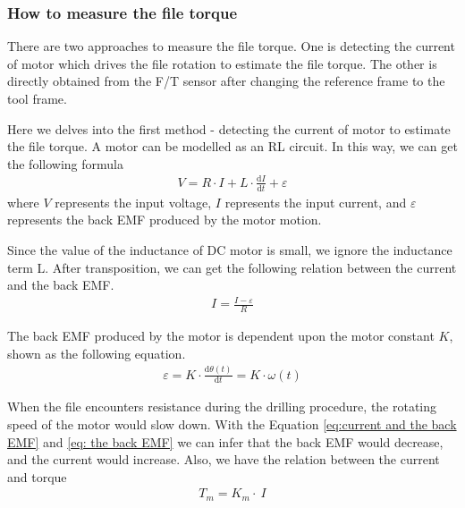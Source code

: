 \subsubsection{How to measure the file torque}
\hspace*{6mm}There are two approaches to measure the file torque. One is detecting the current of motor which drives the file rotation to estimate the file torque. The other is directly obtained from the F/T sensor after changing the reference frame to the tool frame. 
\par
Here we delves into the first method - detecting the current of motor to estimate the file torque. A motor can be modelled as an RL circuit. In this way, we can get the following formula 
\begin{equation}
\begin{split}
V = R \cdot I + L  \cdot \frac{\mathrm{d}I}{\mathrm{d}t} + \varepsilon
\end{split}
\end{equation}
where $V$ represents the input voltage, $I$ represents the input current, and $\varepsilon $ represents the back EMF produced by the motor motion.
\par
Since the value of the inductance of DC motor is small, we ignore the inductance term L. After transposition, we can get the following relation between the current and the back EMF.
\begin{equation}
\label{eq:current and the back EMF}
\begin{split}
I = \frac{I - \varepsilon}{R}
\end{split}
\end{equation}
\par\noindent
The back EMF produced by the motor is dependent upon the motor constant $K$, shown as the following equation.
\begin{equation}
\label{eq: the back EMF}
\begin{split}
\varepsilon  = K \cdot \frac{\mathrm{d}\theta (t)}{\mathrm{d}t} = K \cdot \omega (t)
\end{split}
\end{equation}
\par
When the file encounters resistance during the drilling procedure, the rotating speed of the motor would slow down. With the Equation \ref{eq:current and the back EMF} and \ref{eq: the back EMF} we can infer that the back EMF would decrease, and the current would increase.
Also, we have the relation between the current and torque
\begin{equation}
\begin{split}
T_m = K_m  \cdot \ I
\end{split}
\end{equation}
